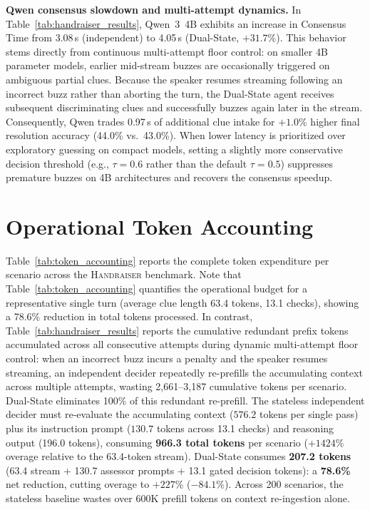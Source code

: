 \documentclass{article}
\begin{document}
\textbf{Qwen consensus slowdown and multi-attempt dynamics.} In Table~\ref{tab:handraiser_results}, Qwen~3~4B exhibits an increase in Consensus Time from 3.08\,s (independent) to 4.05\,s (Dual-State, $+31.7\%$). This behavior stems directly from continuous multi-attempt floor control: on smaller 4B parameter models, earlier mid-stream buzzes are occasionally triggered on ambiguous partial clues. Because the speaker resumes streaming following an incorrect buzz rather than aborting the turn, the Dual-State agent receives subsequent discriminating clues and successfully buzzes again later in the stream. Consequently, Qwen trades 0.97\,s of additional clue intake for $+1.0\%$ higher final resolution accuracy (44.0\% vs.\ 43.0\%). When lower latency is prioritized over exploratory guessing on compact models, setting a slightly more conservative decision threshold (e.g., $\tau = 0.6$ rather than the default $\tau = 0.5$) suppresses premature buzzes on 4B architectures and recovers the consensus speedup.

\section{Operational Token Accounting}
\label{app:tokens}

Table~\ref{tab:token_accounting} reports the complete token expenditure per scenario across the \textsc{Handraiser} benchmark. Note that Table~\ref{tab:token_accounting} quantifies the operational budget for a representative single turn (average clue length 63.4 tokens, 13.1 checks), showing a 78.6\% reduction in total tokens processed. In contrast, Table~\ref{tab:handraiser_results} reports the cumulative redundant prefix tokens accumulated across all consecutive attempts during dynamic multi-attempt floor control: when an incorrect buzz incurs a penalty and the speaker resumes streaming, an independent decider repeatedly re-prefills the accumulating context across multiple attempts, wasting 2{,}661--3{,}187 cumulative tokens per scenario. Dual-State eliminates 100\% of this redundant re-prefill. The stateless independent decider must re-evaluate the accumulating context ($576.2$ tokens per single pass) plus its instruction prompt ($130.7$ tokens across 13.1 checks) and reasoning output (196.0 tokens), consuming \textbf{966.3 total tokens} per scenario ($+1424\%$ overage relative to the 63.4-token stream). Dual-State consumes \textbf{207.2 tokens} (63.4 stream + 130.7 assessor prompts + 13.1 gated decision tokens): a \textbf{78.6\%} net reduction, cutting overage to $+227\%$ ($-84.1\%$). Across 200 scenarios, the stateless baseline wastes over 600K prefill tokens on context re-ingestion alone.
\end{document}
